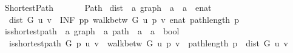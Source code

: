 %
\begin{isabellebody}%
%
%
\isadelimtheory
%
\endisadelimtheory
%
\isatagtheory
{}\isamarkupfalse%
\ Shortest{\isacharunderscore}{\kern0pt}Path\isanewline
\ \ \isanewline
\ \ \ \ Path\isanewline
{}%
\endisatagtheory
{\isafoldtheory}%
%
\isadelimtheory
\isanewline
%
\endisadelimtheory
\isanewline
{}\isamarkupfalse%
\ dist\ {\isacharcolon}{\kern0pt}{\isacharcolon}{\kern0pt}\ {\isachardoublequoteopen}{\isacharprime}{\kern0pt}a\ graph\ {\isasymRightarrow}\ {\isacharprime}{\kern0pt}a\ {\isasymRightarrow}\ {\isacharprime}{\kern0pt}a\ {\isasymRightarrow}\ enat{\isachardoublequoteclose}\ \isanewline
\ \ {\isachardoublequoteopen}dist\ G\ u\ v\ {\isasymequiv}\ INF\ p{\isasymin}{\isacharbraceleft}{\kern0pt}p{\isachardot}{\kern0pt}\ walk{\isacharunderscore}{\kern0pt}betw\ G\ u\ p\ v{\isacharbraceright}{\kern0pt}{\isachardot}{\kern0pt}\ enat\ {\isacharparenleft}{\kern0pt}path{\isacharunderscore}{\kern0pt}length\ p{\isacharparenright}{\kern0pt}{\isachardoublequoteclose}\isanewline
\isanewline
{}\isamarkupfalse%
\ is{\isacharunderscore}{\kern0pt}shortest{\isacharunderscore}{\kern0pt}path\ {\isacharcolon}{\kern0pt}{\isacharcolon}{\kern0pt}\ {\isachardoublequoteopen}{\isacharprime}{\kern0pt}a\ graph\ {\isasymRightarrow}\ {\isacharprime}{\kern0pt}a\ path\ {\isasymRightarrow}\ {\isacharprime}{\kern0pt}a\ {\isasymRightarrow}\ {\isacharprime}{\kern0pt}a\ {\isasymRightarrow}\ bool{\isachardoublequoteclose}\ \isanewline
\ \ {\isachardoublequoteopen}is{\isacharunderscore}{\kern0pt}shortest{\isacharunderscore}{\kern0pt}path\ G\ p\ u\ v\ {\isasymequiv}\ walk{\isacharunderscore}{\kern0pt}betw\ G\ u\ p\ v\ {\isasymand}\ path{\isacharunderscore}{\kern0pt}length\ p\ {\isacharequal}{\kern0pt}\ dist\ G\ u\ v{\isachardoublequoteclose}\isanewline
%
\isadelimtheory
\isanewline
%
\endisadelimtheory
%
\isatagtheory
{}\isamarkupfalse%
%
\endisatagtheory
{\isafoldtheory}%
%
\isadelimtheory
%
\endisadelimtheory
%
\end{isabellebody}%
\endinput
